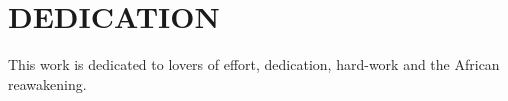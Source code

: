 \chapter*{\large DEDICATION}
This work is dedicated to lovers of effort, dedication, hard-work and the African reawakening. 